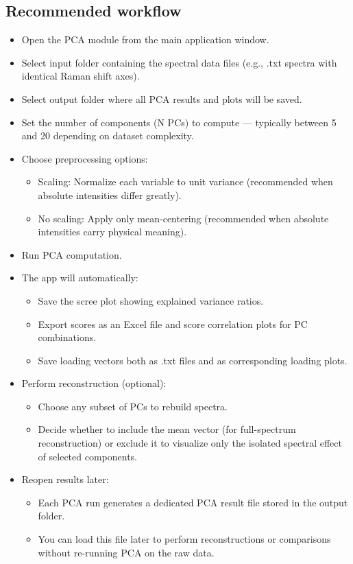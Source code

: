 \subsection{Recommended workflow}

\begin{itemize}
    \item Open the PCA module from the main application window.
    \item Select input folder containing the spectral data files (e.g., .txt spectra with identical Raman shift axes).
    \item Select output folder where all PCA results and plots will be saved.
    \item Set the number of components (N PCs) to compute — typically between 5 and 20 depending on dataset complexity.
    \item Choose preprocessing options:
    \begin{itemize}
        \item Scaling: Normalize each variable to unit variance (recommended when absolute intensities differ greatly).
        \item No scaling: Apply only mean-centering (recommended when absolute intensities carry physical meaning).
    \end{itemize}
    \item Run PCA computation.
    \item The app will automatically:
    \begin{itemize}
        \item Save the scree plot showing explained variance ratios.
        \item Export scores as an Excel file and score correlation plots for PC combinations.
        \item Save loading vectors both as .txt files and as corresponding loading plots.
    \end{itemize}
    \item Perform reconstruction (optional):
    \begin{itemize}
        \item Choose any subset of PCs to rebuild spectra.
        \item Decide whether to include the mean vector (for full-spectrum reconstruction) or exclude it to visualize only the isolated spectral effect of selected components.
    \end{itemize}
    \item Reopen results later:
    \begin{itemize}
        \item Each PCA run generates a dedicated PCA result file stored in the output folder.
        \item You can load this file later to perform reconstructions or comparisons without re-running PCA on the raw data.
    \end{itemize}
\end{itemize}